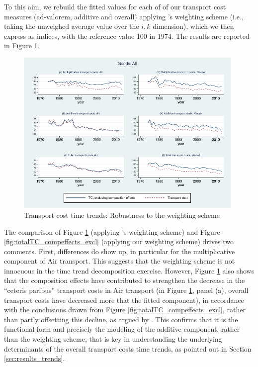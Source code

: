 \documentclass[a4paper,11pt]{article}
\begin{document}
To this aim, we rebuild the fitted values for each of of our transport cost measures (ad-valorem, additive and overall) applying \citet{hummels2007}'s weighting scheme (i.e., taking the unweighed average value over the $i,k$ dimension), which we then express as indices, with the reference value 100 in 1974.
The results are reported in Figure \ref{fig:compeffects_robustness}.

\begin{figure}[htbp]
\caption{Transport cost time trends: Robustness to the weighting scheme}
\label{fig:compeffects_robustness}
\begin{center}
\includegraphics[height=8cm]
{graph_composition_all_np.pdf}
\end{center}
\end{figure}

The comparison of Figure \ref{fig:compeffects_robustness} (applying \citealp{hummels2007}'s weighting scheme) and Figure \ref{fig:totalTC_compeffects_excl} (applying our weighting scheme) drives two comments.
First, differences do show up, in particular for the multiplicative component of Air transport.
This suggests that the weighting scheme is not innocuous in the time trend decomposition exercise.
However, Figure \ref{fig:compeffects_robustness} also shows that the composition effects have contributed to strengthen the decrease in the ``ceteris paribus'' transport costs in Air transport (in Figure \ref{fig:compeffects_robustness}, panel (a), overall transport costs have decreased more that the fitted component), in accordance with the conclusions drawn from Figure \ref{fig:totalTC_compeffects_excl}, rather than partly offsetting this decline, as argued by \cite{hummels2007}.
This confirms that it is the functional form and precisely the modeling of the additive component, rather than the weighting scheme, that is key in understanding the underlying determinants of the overall transport costs time trends, as pointed out in Section \ref{sec:results_trends}.
\end{document}
